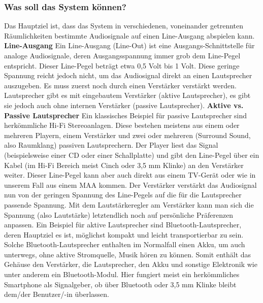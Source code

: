 \documentclass[11pt, twoside]{article}
\begin{document}
\subsubsection{Was soll das System können?}
Das Hauptziel ist, dass das System in verschiedenen, voneinander getrennten Räumlichkeiten bestimmte Audiosignale auf einen Line-Ausgang abspielen kann.
\vspace{4mm}\newline
\textbf{Line-Ausgang}\newline
Ein Line-Ausgang (Line-Out) ist eine Ausgangs-Schnittstelle für analoge Audiosignale, deren Ausgangsspannung immer grob dem Line-Pegel entspricht. Dieser \glqq Line-Pegel beträgt etwa 0,5 Volt bis 1 Volt\grqq{}. \parencite{noauthor_urlnl01_nodate} \newline
Diese geringe Spannung reicht jedoch nicht, um das Audiosignal direkt an einen Lautsprecher auszugeben. Es muss zuerst noch durch einen Verstärker verstärkt werden. Lautsprecher gibt es mit eingebautem Verstärker (aktive Lautsprecher), es gibt sie jedoch auch ohne internen Verstärker (passive Lautsprecher).
\vspace{4mm}\newline
\parencite[vgl.][]{noauthor_urlnl01_nodate}
\vspace{4mm}\newline
\textbf{Aktive vs. Passive Lautsprecher}\newline
Ein klassisches Beispiel für passive Lautsprecher sind herkömmliche Hi-Fi Stereoanlagen. Diese bestehen meistens aus einem oder mehreren Playern, einem Verstärker und zwei oder mehreren (Surround Sound, also Raumklang) passiven Lautsprechern. Der Player liest das Signal (beispielsweise einer CD oder einer Schallplatte) und gibt den Line-Pegel über ein Kabel (im Hi-Fi Bereich meist Cinch oder 3,5 mm Klinke) an den Verstärker weiter. Dieser Line-Pegel kann aber auch direkt aus einem TV-Gerät oder wie in unserem Fall aus einem MAA kommen. Der Verstärker verstärkt das Audiosignal nun von der geringen Spannung des Line-Pegels auf die für die Lautsprecher passende Spannung. Mit dem Lautstärkeregler am Verstärker kann man sich die Spannung (also Lautstärke) letztendlich noch auf persönliche Präferenzen anpassen. \newline
Ein Beispiel für aktive Lautsprecher sind Bluetooth-Lautsprecher, deren Hauptziel es ist, möglichst kompakt und leicht transportierbar zu sein. Solche Bluetooth-Lautsprecher enthalten im Normalfall einen Akku, um auch unterwegs, ohne aktive Stromquelle, Musik hören zu können. Somit enthält das Gehäuse den Verstärker, die Lautsprecher, den Akku und sonstige Elektronik wie unter anderem ein Bluetooth-Modul. Hier fungiert meist ein herkömmliches Smartphone als Signalgeber, ob über Bluetooth oder 3,5 mm Klinke bleibt dem/der Benutzer/-in überlassen.\newline
\end{document}
